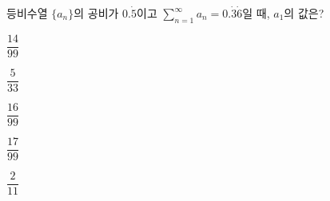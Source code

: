 등비수열 $\{a_n\}$의 공비가 $0.\dot{5}$이고 $\displaystyle\sum_{n=1}^{\infty} a_n=0.\dot{3}\dot{6}$일 때, $a_1$의 값은?
\begin{choices32}{\rule[-3ex]{0pt}{8ex}$\dfrac{14}{99}$}{\rule[-3ex]{0pt}{8ex}$\dfrac{5}{33}$}{\rule[-3ex]{0pt}{8ex}$\dfrac{16}{99}$}{\rule[-3ex]{0pt}{8ex}$\dfrac{17}{99}$}{\rule[-3ex]{0pt}{8ex}$\dfrac{2}{11}$}\end{choices32}
